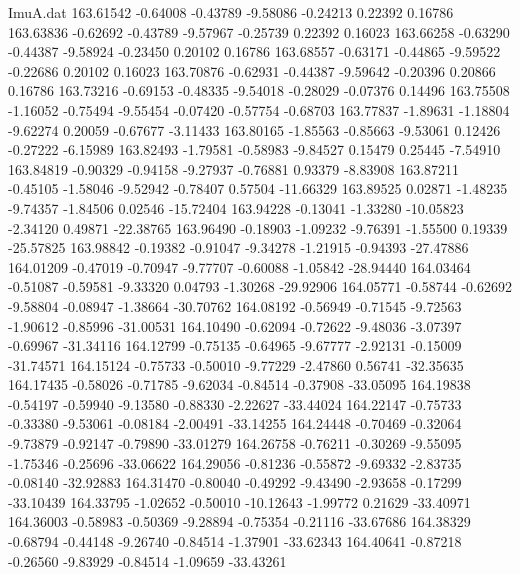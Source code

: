 \begin{filecontents}{ImuA.dat}
 163.61542   -0.64008   -0.43789   -9.58086   -0.24213    0.22392    0.16786
 163.63836   -0.62692   -0.43789   -9.57967   -0.25739    0.22392    0.16023
 163.66258   -0.63290   -0.44387   -9.58924   -0.23450    0.20102    0.16786
 163.68557   -0.63171   -0.44865   -9.59522   -0.22686    0.20102    0.16023
 163.70876   -0.62931   -0.44387   -9.59642   -0.20396    0.20866    0.16786
 163.73216   -0.69153   -0.48335   -9.54018   -0.28029   -0.07376    0.14496
 163.75508   -1.16052   -0.75494   -9.55454   -0.07420   -0.57754   -0.68703
 163.77837   -1.89631   -1.18804   -9.62274    0.20059   -0.67677   -3.11433
 163.80165   -1.85563   -0.85663   -9.53061    0.12426   -0.27222   -6.15989
 163.82493   -1.79581   -0.58983   -9.84527    0.15479    0.25445   -7.54910
 163.84819   -0.90329   -0.94158   -9.27937   -0.76881    0.93379   -8.83908
 163.87211   -0.45105   -1.58046   -9.52942   -0.78407    0.57504  -11.66329
 163.89525    0.02871   -1.48235   -9.74357   -1.84506    0.02546  -15.72404
 163.94228   -0.13041   -1.33280  -10.05823   -2.34120    0.49871  -22.38765
 163.96490   -0.18903   -1.09232   -9.76391   -1.55500    0.19339  -25.57825
 163.98842   -0.19382   -0.91047   -9.34278   -1.21915   -0.94393  -27.47886
 164.01209   -0.47019   -0.70947   -9.77707   -0.60088   -1.05842  -28.94440
 164.03464   -0.51087   -0.59581   -9.33320    0.04793   -1.30268  -29.92906
 164.05771   -0.58744   -0.62692   -9.58804   -0.08947   -1.38664  -30.70762
 164.08192   -0.56949   -0.71545   -9.72563   -1.90612   -0.85996  -31.00531
 164.10490   -0.62094   -0.72622   -9.48036   -3.07397   -0.69967  -31.34116
 164.12799   -0.75135   -0.64965   -9.67777   -2.92131   -0.15009  -31.74571
 164.15124   -0.75733   -0.50010   -9.77229   -2.47860    0.56741  -32.35635
 164.17435   -0.58026   -0.71785   -9.62034   -0.84514   -0.37908  -33.05095
 164.19838   -0.54197   -0.59940   -9.13580   -0.88330   -2.22627  -33.44024
 164.22147   -0.75733   -0.33380   -9.53061   -0.08184   -2.00491  -33.14255
 164.24448   -0.70469   -0.32064   -9.73879   -0.92147   -0.79890  -33.01279
 164.26758   -0.76211   -0.30269   -9.55095   -1.75346   -0.25696  -33.06622
 164.29056   -0.81236   -0.55872   -9.69332   -2.83735   -0.08140  -32.92883
 164.31470   -0.80040   -0.49292   -9.43490   -2.93658   -0.17299  -33.10439
 164.33795   -1.02652   -0.50010  -10.12643   -1.99772    0.21629  -33.40971
 164.36003   -0.58983   -0.50369   -9.28894   -0.75354   -0.21116  -33.67686
 164.38329   -0.68794   -0.44148   -9.26740   -0.84514   -1.37901  -33.62343
 164.40641   -0.87218   -0.26560   -9.83929   -0.84514   -1.09659  -33.43261

\end{filecontents}
